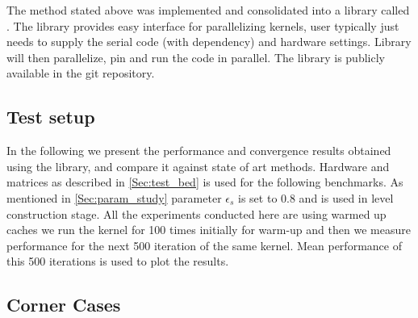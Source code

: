 The method stated above was implemented and consolidated into a library called \RACE. The library provides easy interface for parallelizing kernels, user typically just needs to supply the serial code (with dependency) and hardware settings. Library will then parallelize, pin and run the code in parallel. The library is publicly available in the git repository. %

\subsection{Test setup}
In the following we present the performance and convergence results obtained using the library, and compare it against state of art methods. Hardware and matrices as described in \cref{Sec:test_bed} is used for the following benchmarks. As mentioned in \cref{Sec:param_study} parameter $\epsilon_s$ is set to 0.8 and \RCM is used in level construction stage. All the experiments conducted here are using warmed up caches \ie we run the kernel for 100 times initially for warm-up and then we measure performance for the next 500 iteration of the same kernel. Mean performance of this 500 iterations is used to plot the results.

\subsection{Corner Cases}

